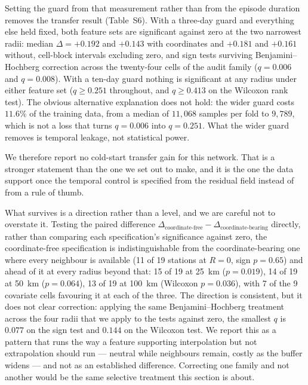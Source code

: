 \documentclass[review,times,authoryear]{elsarticle}
\begin{document}
Setting the guard from that measurement rather than from the episode duration removes the transfer result (Table~S6). With a three-day guard and everything else held fixed, both feature sets are significant against zero at the two narrowest radii: median $\Delta=+0.192$ and $+0.143$ with coordinates and $+0.181$ and $+0.161$ without, cell-block intervals excluding zero, and sign tests surviving Benjamini--Hochberg correction across the twenty-four cells of the audit family ($q=0.006$ and $q=0.008$). With a ten-day guard nothing is significant at any radius under either feature set ($q\geq0.251$ throughout, and $q\geq0.413$ on the Wilcoxon rank test). The obvious alternative explanation does not hold: the wider guard costs $11.6\%$ of the training data, from a median of $11{,}068$ samples per fold to $9{,}789$, which is not a loss that turns $q=0.006$ into $q=0.251$. What the wider guard removes is temporal leakage, not statistical power.

We therefore report no cold-start transfer gain for this network. That is a stronger statement than the one we set out to make, and it is the one the data support once the temporal control is specified from the residual field instead of from a rule of thumb.

What survives is a direction rather than a level, and we are careful not to overstate it. Testing the paired difference $\Delta_{\text{coordinate-free}}-\Delta_{\text{coordinate-bearing}}$ directly, rather than comparing each specification's significance against zero, the coordinate-free specification is indistinguishable from the coordinate-bearing one where every neighbour is available (11 of 19 stations at $R=0$, sign $p=0.65$) and ahead of it at every radius beyond that: 15 of 19 at 25~km ($p=0.019$), 14 of 19 at 50~km ($p=0.064$), 13 of 19 at 100~km (Wilcoxon $p=0.036$), with 7 of the 9 covariate cells favouring it at each of the three. The direction is consistent, but it does not clear correction: applying the same Benjamini--Hochberg treatment across the four radii that we apply to the tests against zero, the smallest $q$ is $0.077$ on the sign test and $0.144$ on the Wilcoxon test. We report this as a pattern that runs the way a feature supporting interpolation but not extrapolation should run --- neutral while neighbours remain, costly as the buffer widens --- and not as an established difference. Correcting one family and not another would be the same selective treatment this section is about.
\end{document}
